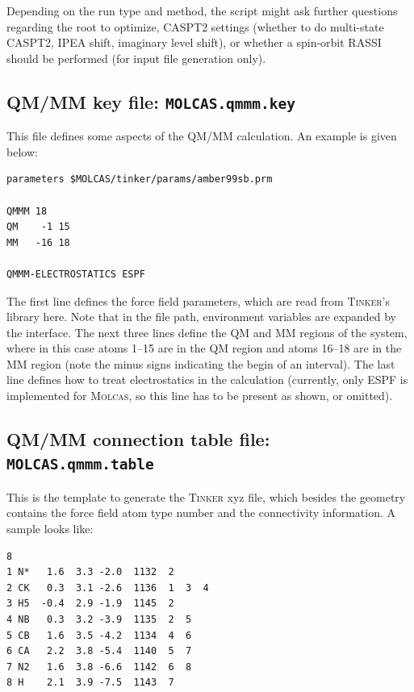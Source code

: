 \documentclass[a4paper,10pt,DIV=15,openany]{scrbook}
\newcommand{\ttt}[1]{\textbf{\texttt{#1}}}
\newenvironment{example}{
  \setlength{\OuterFrameSep}{3pt}
  \vspace{0mm}
  \definecolor{shadecolor}{HTML}{E4F4FF}
  \begin{shaded}
}{
  \end{shaded}
}
\begin{document}
Depending on the run type and method, the script might ask further questions regarding the root to optimize, CASPT2 settings (whether to do multi-state CASPT2, IPEA shift, imaginary level shift), or whether a spin-orbit RASSI should be performed (for input file generation only).



\subsection{QM/MM key file: \ttt{MOLCAS.qmmm.key}}

This file defines some aspects of the QM/MM calculation. An example is given below:

\begin{example}
\begin{verbatim}
parameters $MOLCAS/tinker/params/amber99sb.prm

QMMM 18
QM    -1 15
MM   -16 18

QMMM-ELECTROSTATICS ESPF
\end{verbatim}
\end{example}

The first line defines the force field parameters, which are read from \textsc{Tinker}'s library here. Note that in the file path, environment variables are expanded by the interface.
The next three lines define the QM and MM regions of the system, where in this case atoms 1--15 are in the QM region and atoms 16--18 are in the MM region (note the minus signs indicating the begin of an interval). The last line defines how to treat electrostatics in the calculation (currently, only ESPF is implemented for \textsc{Molcas}, so this line has to be present as shown, or omitted).

\subsection{QM/MM connection table file: \ttt{MOLCAS.qmmm.table}}

This is the template to generate the \textsc{Tinker} xyz file, which besides the geometry contains the force field atom type number and the connectivity information. A sample looks like:

\begin{example}
\begin{verbatim}
8
1 N*   1.6  3.3 -2.0  1132  2
2 CK   0.3  3.1 -2.6  1136  1  3  4
3 H5  -0.4  2.9 -1.9  1145  2
4 NB   0.3  3.2 -3.9  1135  2  5
5 CB   1.6  3.5 -4.2  1134  4  6
6 CA   2.2  3.8 -5.4  1140  5  7
7 N2   1.6  3.8 -6.6  1142  6  8
8 H    2.1  3.9 -7.5  1143  7
\end{verbatim}
\end{example}
\end{document}
